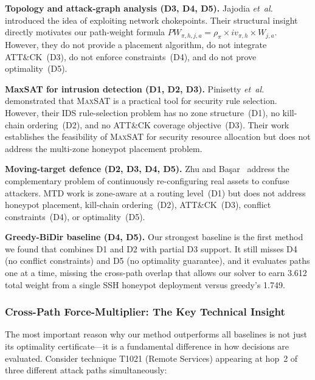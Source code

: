 \documentclass[journal]{IEEEtran}
\newcommand{\xmark}{\textcolor{novelred}{\ding{55}}}
\newcommand{\etal}{\emph{et~al.}}
\newcommand{\maxsat}{\textsc{MaxSAT}}
\begin{document}
\textbf{Topology and attack-graph analysis (\xmark{}D3,
\xmark{}D4, \xmark{}D5).}
Jajodia \etal{}~\cite{jajodia2005} introduced the idea of
exploiting network chokepoints.
Their structural insight directly motivates our path-weight
formula
$PW_{\pi,h,j,a} = \rho_\pi \times iv_{\pi,h} \times W_{j,a}$.
However, they do not provide a placement algorithm, do not
integrate ATT\&CK~(D3), do not enforce constraints~(D4),
and do not prove optimality~(D5).

\textbf{MaxSAT for intrusion detection
(\xmark{}D1, \xmark{}D2, \xmark{}D3).}
Pinisetty \etal{}~\cite{pinisetty2017} demonstrated that
\maxsat{} is a practical tool for security rule selection.
However, their IDS rule-selection problem has no zone
structure~(D1), no kill-chain ordering~(D2), and no ATT\&CK
coverage objective~(D3).
Their work establishes the feasibility of \maxsat{} for
security resource allocation but does not address the
multi-zone honeypot placement problem.

\textbf{Moving-target defence (\xmark{}D2, \xmark{}D3,
\xmark{}D4, \xmark{}D5).}
Zhu and Ba\c{s}ar~\cite{zhu2013} address the complementary
problem of continuously re-configuring real assets to confuse
attackers.
MTD work is zone-aware at a routing level~(D1) but does not
address honeypot placement, kill-chain ordering~(D2),
ATT\&CK~(D3), conflict constraints~(D4), or
optimality~(D5).

\textbf{Greedy-BiDir baseline (\xmark{}D4, \xmark{}D5).}
Our strongest baseline is the first method we found that
combines D1 and D2 with partial D3 support.
It still misses D4 (no conflict constraints) and D5 (no
optimality guarantee), and it evaluates paths one at a time,
missing the cross-path overlap that allows our solver to earn
3.612 total weight from a single SSH honeypot deployment
versus greedy's 1.749.

\subsubsection{Cross-Path Force-Multiplier: The Key Technical
              Insight}

The most important reason why our method outperforms all
baselines is not just its optimality certificate---it is a
fundamental difference in how decisions are evaluated.
Consider technique T1021 (Remote Services) appearing at
hop~2 of three different attack paths simultaneously:
\end{document}
